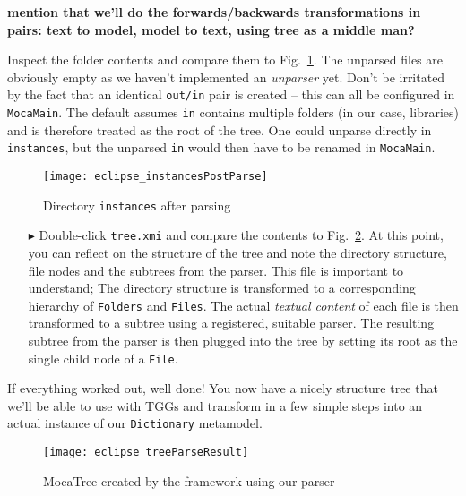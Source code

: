 {\bf mention that we'll do the forwards/backwards transformations in pairs: text to model, model to text, using tree as a middle man?}

\newpage

Inspect the folder contents and compare them to Fig.~\ref{eclipse_postParse}. The unparsed files are obviously empty as we haven't implemented an
\emph{unparser} yet. Don't be irritated by the fact that an identical \texttt{out/in} pair is created -- this can all be configured in \texttt{MocaMain}. The
default assumes \texttt{in} contains multiple folders (in our case, libraries) and is therefore treated as the root of the tree. One could unparse directly in
\texttt{instances}, but the unparsed \texttt{in} would then have to be renamed in \texttt{MocaMain}.

\vspace{0.5cm}

\begin{figure}[!htbp]
\begin{center}
 \texttt{[image: eclipse\_instancesPostParse]}
  \caption{Directory \texttt{instances} after parsing}
  \label{eclipse_postParse}
\end{center}
\end{figure} 

\begin{enumerate}

\item[$\blacktriangleright$] Double-click \texttt{tree.xmi} and compare the contents to Fig.~\ref{eclipse:treeResult}. At this point, you can reflect on the
structure of the tree and note the directory structure, file nodes and the subtrees from the parser. This file is important to understand; The directory
structure is transformed to a corresponding hierarchy of \texttt{Folders} and \texttt{Files}. The actual \emph{textual content} of each file is then transformed
to a subtree using a registered, suitable parser. The resulting subtree from the parser is then plugged into the tree by setting its root as the single child
node of a \texttt{File}.

\end{enumerate}

If everything worked out, well done! You now have a nicely structure tree that we'll be able to use with TGGs and transform in a few simple steps into an actual
instance of our \texttt{Dictionary} metamodel.

\newpage

\vspace*{2cm}

\begin{figure}[!htbp]
\begin{center}
 \texttt{[image: eclipse\_treeParseResult]}
  \caption{MocaTree created by the framework using our parser}
  \label{eclipse:treeResult}
\end{center}
\end{figure}

